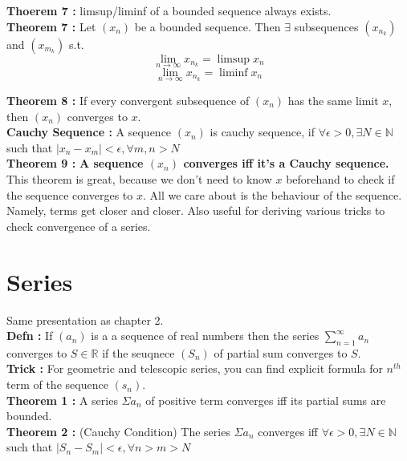 \documentclass{report}
\begin{document}
\noindent \textbf{Thoerem 7 :} limsup/liminf of a bounded sequence always exists.\\

\noindent \textbf{Theorem 7 :} Let $(x_n)$ be a bounded sequence. Then $\exists$ subsequences $(x_{n_k})$ and $(x_{m_k})$ s.t.
$$\lim_{n\to\infty}x_{n_k} = \limsup x_n$$
$$\lim_{n\to\infty}x_{n_k} = \liminf x_n$$



\noindent \textbf{Theorem 8 :} If every convergent subsequence of $(x_n)$ has the same limit $x$, then $(x_n)$ converges to $x$.\\

\noindent \textbf{Cauchy Sequence :} A sequence $(x_n)$ is cauchy sequence, if $\forall \epsilon > 0, \exists N \in \mathbb{N}$ such that $|x_n - x_m| < \epsilon , \forall m,n> N$\\

\noindent \textbf{Theorem 9 :} \textbf{A sequence $(x_n)$ converges iff it's a Cauchy sequence.}\\

This theorem is great, because we don't need to know $x$ beforehand to check if the sequence converges to $x$. All we care about is the behaviour of the sequence. Namely, terms get closer and closer. Also useful for deriving various tricks to check convergence of a series.




\chapter{Series}
Same presentation as chapter 2.\\

\noindent \textbf{Defn : }If $(a_n)$ is a a sequence of real numbers then the series $\sum_{n=1}^{\infty}a_n$  converges to $S \in \mathbb{R}$ if the seuqnece $(S_n)$ of partial sum converges to $S$.\\

\noindent \textbf{Trick : } For geometric and telescopic series, you can find explicit formula for $n^{th}$ term of the sequence $(s_n)$.\\

\noindent \textbf{Theorem 1 :} A series $\Sigma a_n$ of positive term converges iff its partial sums are bounded.\\

\noindent \textbf{Theorem 2 :} (Cauchy Condition) The series $\Sigma a_n$ converges iff $\forall \epsilon > 0, \exists N \in \mathbb{N}$ such that $|S_n - S_m| < \epsilon, \forall n > m > N$\\
\end{document}

